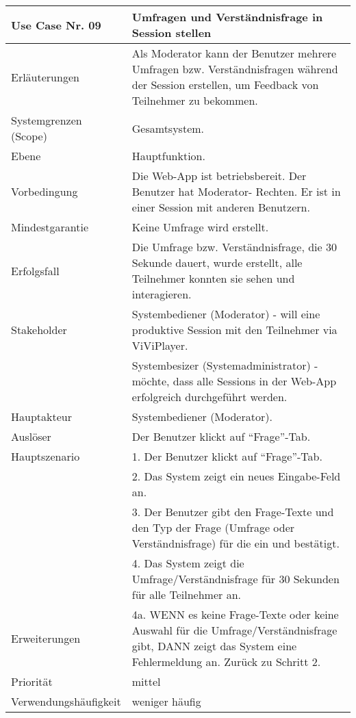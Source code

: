 \begin{tabularx}{\linewidth}{|l|X|}
	\hline
	Use Case Nr. 09			& \textbf{Umfragen und Verständnisfrage in Session stellen} \\ \hline
	Erläuterungen			& Als Moderator kann der Benutzer mehrere Umfragen bzw. Verständnisfragen
							  während der Session erstellen, um Feedback von Teilnehmer zu bekommen. \\ \hline
	Systemgrenzen (Scope)	& Gesamtsystem. \\ \hline
	Ebene					& Hauptfunktion. \\ \hline
	Vorbedingung			& Die Web-App ist betriebsbereit. Der Benutzer hat Moderator-
							  Rechten. Er ist in einer Session mit anderen Benutzern. \\ \hline
	Mindestgarantie			& Keine Umfrage wird erstellt. \\ \hline
	Erfolgsfall 			& Die Umfrage bzw. Verständnisfrage, die 30 Sekunde dauert, wurde erstellt,
							  alle Teilnehmer konnten sie sehen und interagieren. \\ \hline
	Stakeholder				& Systembediener (Moderator) - will eine produktive Session mit den 
							  Teilnehmer via ViViPlayer. \\
							& Systembesizer (Systemadministrator) - möchte, dass alle Sessions in der
							  Web-App erfolgreich durchgeführt werden. \\ \hline
	Hauptakteur				& Systembediener (Moderator). \\ \hline
	Auslöser				& Der Benutzer klickt auf ``Frage''-Tab. \\ \hline	
	Hauptszenario			& 1. Der Benutzer klickt auf ``Frage''-Tab. \\
							& 2. Das System zeigt ein neues Eingabe-Feld an. \\ 
							& 3. Der Benutzer gibt den Frage-Texte und den Typ der Frage (Umfrage
							  oder Verständnisfrage) für die ein und bestätigt. \\
							& 4. Das System zeigt die Umfrage/Verständnisfrage für 30 Sekunden für
							  alle Teilnehmer an. \\ \hline
	Erweiterungen			& 4a. WENN es keine Frage-Texte oder keine Auswahl für die 
							  Umfrage/Verständnisfrage gibt, DANN zeigt das System eine Fehlermeldung an. Zurück zu Schritt 2. \\ \hline
	Priorität				& mittel \\ \hline
	Verwendungshäufigkeit	& weniger häufig \\ \hline
\end{tabularx}